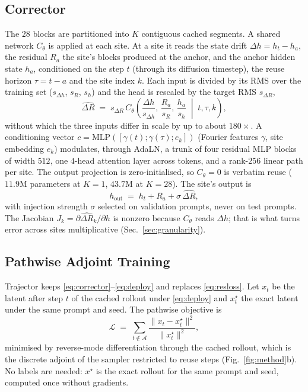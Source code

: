 \documentclass[conference,compsoc]{IEEEtran}
\newcommand{\dR}{\Delta R}
\newcommand{\ourmethod}{Trajector}
\begin{document}
\subsection{Corrector}
The $28$ blocks are partitioned into $K$ contiguous cached segments. A
shared network $C_\theta$ is applied at each site. At a site it reads the state drift $\Delta h=h_t-h_a$, the residual $R_a$ the site's blocks produced at the anchor, and the anchor hidden state $h_a$, conditioned on the step $t$ (through its diffusion timestep), the reuse horizon
$\tau=t-a$ and the site index $k$. Each input is divided by its RMS over the
training set ($s_{\Delta h}$, $s_R$, $s_h$) and the head is
rescaled by the target RMS $s_{\dR}$,
\begin{equation}
\widehat{\dR}
\;=\;
s_{\dR}\,
C_\theta\!\left(
\frac{\Delta h}{s_{\Delta h}},\,
\frac{R_a}{s_R},\,
\frac{h_a}{s_h}
\;\middle|\; t,\tau,k
\right),
\label{eq:corrector}
\end{equation}
without which the three inputs differ in scale by up to about $180\times$.
A conditioning vector $c=\mathrm{MLP}([\gamma(t);\gamma(\tau);e_k])$ (Fourier
features $\gamma$, site embedding $e_k$) modulates, through AdaLN, a trunk of
four residual MLP blocks of width $512$, one $4$-head attention layer across
tokens, and a rank-$256$ linear path per site. The output projection is
zero-initialised, so $C_\theta{=}0$ is verbatim reuse ($11.9$M parameters at
$K{=}1$, $43.7$M at $K{=}28$). The site's output is
\begin{equation}
h_{\mathrm{out}}
\;=\;
h_t + R_a + \sigma\,\widehat{\dR},
\label{eq:deploy}
\end{equation}
with injection strength $\sigma$ selected on validation prompts, never on test prompts.
The Jacobian $J_k=\partial\widehat{\dR}_k/\partial h$ is nonzero because
$C_\theta$ reads $\Delta h$; that is what turns error across sites
multiplicative (Sec.~\ref{sec:granularity}).

\subsection{Pathwise Adjoint Training}
\ourmethod{} keeps \eqref{eq:corrector}--\eqref{eq:deploy} and replaces
\eqref{eq:resloss}. Let $x_t$ be the latent after step $t$ of the cached
rollout under \eqref{eq:deploy} and $x^\star_t$ the exact latent under the
same prompt and seed. The pathwise objective is
\begin{equation}
\mathcal{L}
\;=\;
\sum_{t\notin\mathcal{A}}
\frac{\|x_t-x^\star_t\|^2}{\|x^\star_t\|^2},
\label{eq:loss}
\end{equation}
minimised by reverse-mode differentiation through the cached rollout, which is the discrete adjoint of the sampler restricted to reuse steps
(Fig.~\ref{fig:method}b). No labels are needed: $x^\star$ is the exact rollout for the same prompt and seed, computed once without gradients.
\end{document}
